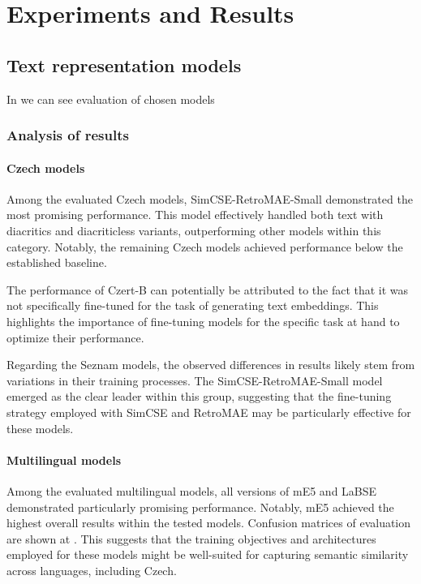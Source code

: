 
\chapter{Experiments and Results\label{chap:experiments_and_results}}

\section{Text representation models}
In  we can see evaluation of chosen models

\subsection{Analysis of results}
\subsubsection{Czech models}
Among the evaluated Czech models, SimCSE-RetroMAE-Small demonstrated the most promising performance.
This model effectively handled both text with diacritics and diacriticless variants, outperforming other models within this category.
Notably, the remaining Czech models achieved performance below the established baseline.

The performance of Czert-B can potentially be attributed to the fact that it was not specifically fine-tuned for the task of generating text embeddings.
This highlights the importance of fine-tuning models for the specific task at hand to optimize their performance.

Regarding the Seznam models, the observed differences in results likely stem from variations in their training processes.
The SimCSE-RetroMAE-Small model emerged as the clear leader within this group, suggesting that the fine-tuning strategy employed with \ac{SimCSE} and \ac{RetroMAE} may be particularly effective for these models.

\subsubsection{Multilingual models}
Among the evaluated multilingual models, all versions of mE5 and LaBSE demonstrated particularly promising performance.
Notably, mE5 achieved the highest overall results within the tested models.
Confusion matrices of evaluation are shown at .
This suggests that the training objectives and architectures employed for these models might be well-suited for capturing semantic similarity across languages, including Czech.

